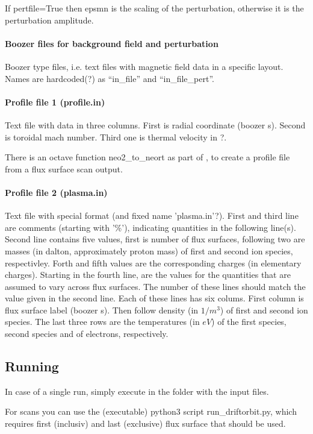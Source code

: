 If pertfile=True then epsmn is the scaling of the perturbation,
otherwise it is the perturbation amplitude.

\paragraph{Boozer files for background field and perturbation}
Boozer type files, i.e. text files with magnetic field data in a
specific layout. Names are hardcoded(?) as ``in_file'' and
``in_file_pert''.

\paragraph{Profile file 1 (profile.in)}
Text file with data in three columns. First is radial coordinate
(boozer s). Second is toroidal mach number. Third one is thermal
velocity in ?.

There is an octave function neo2\_to\_neort as part of \neotwo, to
create a \neort profile file from a \neotwo flux surface scan output.

\paragraph{Profile file 2 (plasma.in)}
Text file with special format (and fixed name 'plasma.in'?). First and
third line are comments (starting with '\%'), indicating quantities in the
following line(s). Second line contains five values, first is number of
flux surfaces, following two are masses (in dalton, approximately proton mass) of
first and second ion species, respectivley. Forth and fifth values are
the corresponding charges (in elementary charges).
Starting in the fourth line, are the values for the quantities that are
assumed to vary across flux surfaces. The number of these lines should
match the value given in the second line.
Each of these lines has six colums. First column is flux surface label
(boozer s). Then follow density (in $1/m^3$) of first and second ion
species.
The last three rows are the temperatures (in $eV$) of the first species,
second species and of electrons, respectively.

\subsection{Running}
In case of a single run, simply execute \neort in the folder with the
input files.

For scans you can use the (executable) python3 script
run\_driftorbit.py, which requires first (inclusiv) and last (exclusive)
flux surface that should be used.

